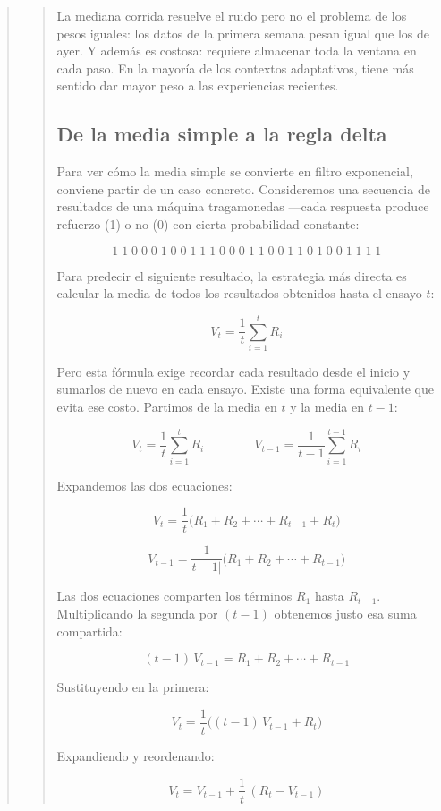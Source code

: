 \documentclass[
  letterpaper,
  DIV=11,
  numbers=noendperiod]{scrreprt}
\begin{document}
\begin{tcolorbox}[enhanced jigsaw, arc=.35mm, bottomrule=.15mm, breakable, colback=white, colframe=quarto-callout-note-color-frame, left=2mm, leftrule=.75mm, opacityback=0, rightrule=.15mm, toprule=.15mm]
\begin{quote}
\begin{quote}
La mediana corrida resuelve el ruido pero no el problema de los pesos
iguales: los datos de la primera semana pesan igual que los de ayer. Y
además es costosa: requiere almacenar toda la ventana en cada paso. En
la mayoría de los contextos adaptativos, tiene más sentido dar mayor
peso a las experiencias recientes.

\mbox{}%
\subsection{De la media simple a la regla
delta}\label{de-la-media-simple-a-la-regla-delta}

Para ver cómo la media simple se convierte en filtro exponencial,
conviene partir de un caso concreto. Consideremos una secuencia de
resultados de una máquina tragamonedas ---cada respuesta produce
refuerzo (1) o no (0) con cierta probabilidad constante:

\[1\;1\;0\;0\;0\;1\;0\;0\;1\;1\;1\;0\;0\;0\;1\;1\;0\;0\;1\;1\;0\;1\;0\;0\;1\;1\;1\;1\]

Para predecir el siguiente resultado, la estrategia más directa es
calcular la media de todos los resultados obtenidos hasta el ensayo
\(t\):

\[V_t = \frac{1}{t}\sum_{i=1}^{t} R_i\]

Pero esta fórmula exige recordar cada resultado desde el inicio y
sumarlos de nuevo en cada ensayo. Existe una forma equivalente que evita
ese costo. Partimos de la media en \(t\) y la media en \(t-1\):

\[V_t = \frac{1}{t}\sum_{i=1}^{t} R_i \qquad \qquad V_{t-1} = \frac{1}{t-1}\sum_{i=1}^{t-1} R_i\]

Expandemos las dos ecuaciones:

\[V_t = \frac{1}{t}\bigl(R_1 + R_2 + \cdots + R_{t-1} + R_t\bigr)\]

\[V_{t -1}= \frac{1}{t-1|}\bigl(R_1 + R_2 + \cdots + R_{t-1} )\]

Las dos ecuaciones comparten los términos \(R_1\) hasta \(R_{t-1}\).
Multiplicando la segunda por \((t-1)\) obtenemos justo esa suma
compartida:

\[(t-1)\,V_{t-1} = R_1 + R_2 + \cdots + R_{t-1}\]

Sustituyendo en la primera:

\[V_t = \frac{1}{t}\bigl((t-1)\,V_{t-1} + R_t\bigr)\]

Expandiendo y reordenando:

\[V_t = V_{t-1} + \frac{1}{t}\,(R_t - V_{t-1})\]


\end{quote}
\end{quote}
\end{tcolorbox}
\end{document}
